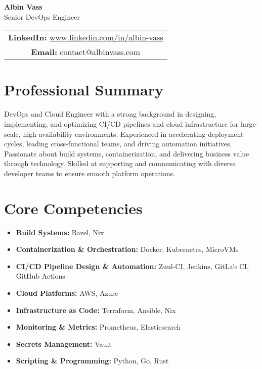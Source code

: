\documentclass[11pt,a4paper]{article}
\begin{document}
\begin{center}
    {\huge\bfseries\color{darkblue} Albin Vass} \\
    \vspace{0.5em}
    {\Large Senior DevOps Engineer} \\
    \vspace{1em}
    \begin{tabular}{c}
        \textbf{LinkedIn:} \href{http://www.linkedin.com/in/albin-vass}{www.linkedin.com/in/albin-vass} \\
        \textbf{Email:} contact@albinvass.com \\
    \end{tabular}
\end{center}

\vspace{1em}

\section{Professional Summary}
DevOps and Cloud Engineer with a strong background in designing, implementing, and optimizing CI/CD pipelines and cloud infrastructure for large-scale, high-availability environments. Experienced in accelerating deployment cycles, leading cross-functional teams, and driving automation initiatives. Passionate about build systems, containerization, and delivering business value through technology. Skilled at supporting and communicating with diverse developer teams to ensure smooth platform operations.

\section{Core Competencies}
\begin{itemize}[leftmargin=*]
    \item \textbf{Build Systems:} Bazel, Nix
    \item \textbf{Containerization \& Orchestration:} Docker, Kubernetes, MicroVMs
    \item \textbf{CI/CD Pipeline Design \& Automation:} Zuul-CI, Jenkins, GitLab CI, GitHub Actions
    \item \textbf{Cloud Platforms:} AWS, Azure
    \item \textbf{Infrastructure as Code:} Terraform, Ansible, Nix
    \item \textbf{Monitoring \& Metrics:} Prometheus, Elasticsearch
    \item \textbf{Secrets Management:} Vault
    \item \textbf{Scripting \& Programming:} Python, Go, Rust
\end{itemize}
\end{document}
